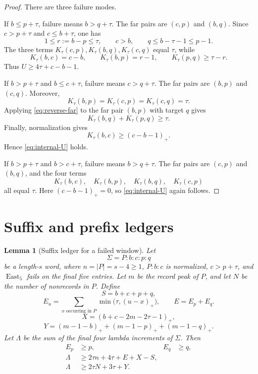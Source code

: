 \documentclass[11pt]{article}
\newtheorem{lemma}[theorem]{Lemma}
\theoremstyle{definition}
\theoremstyle{remark}
\newcommand{\East}{\operatorname{East}}
\begin{document}
\begin{proof}
There are three failure modes.

If \(b\le p+\tau\), failure means \(b>q+\tau\).  The far pairs are
\((c,p)\) and \((b,q)\).  Since \(c>p+\tau\) and
\(c\le b+\tau\), one has
\[
  1\le r:=b-p\le\tau,
  \qquad c>b,
  \qquad q\le b-\tau-1\le p-1.
\]
The three terms \(K_\tau(c,p),K_\tau(b,q),K_\tau(c,q)\) equal
\(\tau\), while
\[
  K_\tau(b,c)=c-b,
  \qquad
  K_\tau(b,p)=r-1,
  \qquad
  K_\tau(p,q)\ge\tau-r.
\]
Thus \(U\ge4\tau+c-b-1\).

If \(b>p+\tau\) and \(b\le c+\tau\), failure means
\(c>q+\tau\).  The far pairs are \((b,p)\) and \((c,q)\).
Moreover,
\[
  K_\tau(b,p)=K_\tau(c,p)=K_\tau(c,q)=\tau.
\]
Applying \eqref{eq:reverse-far} to the far pair \((b,p)\) with target
\(q\) gives
\[
  K_\tau(b,q)+K_\tau(p,q)\ge\tau.
\]
Finally, normalization gives
\[
  K_\tau(b,c)\ge(c-b-1)_+.
\]
Hence \eqref{eq:internal-U} holds.

If \(b>p+\tau\) and \(b>c+\tau\), failure means
\(b>q+\tau\).  The far pairs are \((c,p)\) and \((b,q)\), and the
four terms
\[
  K_\tau(b,c),\quad K_\tau(b,p),\quad
  K_\tau(b,q),\quad K_\tau(c,p)
\]
all equal \(\tau\).  Here \((c-b-1)_+=0\), so
\eqref{eq:internal-U} again follows.
\end{proof}

\section{Suffix and prefix ledgers}

\begin{lemma}[Suffix ledger for a failed window]
\label{lem:suffix-ledger}
Let
\[
  \Sigma=P:b:c:p:q
\]
be a length-\(s\) word, where \(n=|P|=s-4\ge1\), \(P:b:c\) is
normalized, \(c>p+\tau\), and \(\East_5\) fails on the final five
entries.  Let \(m\) be the record peak of \(P\), and let \(N\) be the
number of nonrecords in \(P\).  Define
\[
  S=b+c+p+q,
\]
\[
  E_u=\sum_{x\text{ occurring in }P}
       \min\bigl(\tau,(u-x)_+\bigr),
  \qquad E=E_p+E_q.
\]
\[
  X=(b+c-2m-2\tau-1)_+,
\]
\[
  Y=(m-1-b)_++(m-1-p)_++(m-1-q)_+.
\]
Let \(\Lambda\) be the sum of the final four lambda increments of
\(\Sigma\).  Then
\begin{align}
  E_p&\ge p,
  &E_q&\ge q,
  \label{eq:E-pays}\\
  \Lambda&\ge2\tau n+4\tau+E+X-S,
  \label{eq:suffix-refined}\\
  \Lambda&\ge2\tau N+3\tau+Y.
  \label{eq:suffix-low}
\end{align}
\end{lemma}
\end{document}
